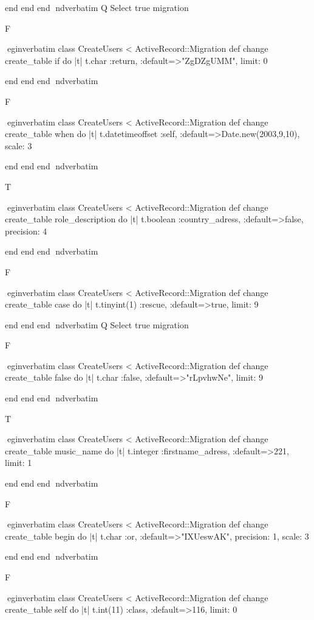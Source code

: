     end 
  end 
end
nd{verbatim}
Q
 Select true migration

F

egin{verbatim}
 class CreateUsers < ActiveRecord::Migration 
  def change 
    create_table if do |t| 
      t.char :return, :default=>"ZgDZgUMM", limit: 0
    
    end 
  end 
end
nd{verbatim}

F

egin{verbatim}
 class CreateUsers < ActiveRecord::Migration 
  def change 
    create_table when do |t| 
      t.datetimeoffset :self, :default=>Date.new(2003,9,10), scale: 3
    
    end 
  end 
end
nd{verbatim}

T

egin{verbatim}
 class CreateUsers < ActiveRecord::Migration 
  def change 
    create_table role_description do |t| 
      t.boolean :country_adress, :default=>false, precision: 4
    
    end 
  end 
end
nd{verbatim}

F

egin{verbatim}
 class CreateUsers < ActiveRecord::Migration 
  def change 
    create_table case do |t| 
      t.tinyint(1) :rescue, :default=>true, limit: 9
    
    end 
  end 
end
nd{verbatim}
Q
 Select true migration

F

egin{verbatim}
 class CreateUsers < ActiveRecord::Migration 
  def change 
    create_table false do |t| 
      t.char :false, :default=>"rLpvhwNe", limit: 9
    
    end 
  end 
end
nd{verbatim}

T

egin{verbatim}
 class CreateUsers < ActiveRecord::Migration 
  def change 
    create_table music_name do |t| 
      t.integer :firstname_adress, :default=>221, limit: 1
    
    end 
  end 
end
nd{verbatim}

F

egin{verbatim}
 class CreateUsers < ActiveRecord::Migration 
  def change 
    create_table begin do |t| 
      t.char :or, :default=>"IXUeswAK", precision: 1, scale: 3
    
    end 
  end 
end
nd{verbatim}

F

egin{verbatim}
 class CreateUsers < ActiveRecord::Migration 
  def change 
    create_table self do |t| 
      t.int(11) :class, :default=>116, limit: 0
    
